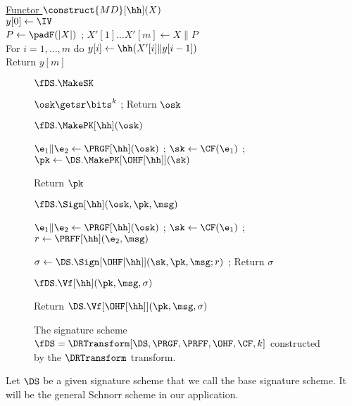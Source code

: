 \begin{tabbing}
\underline{Functor $\construct{MD}[\hh](X)$} \\[2pt]
$y[0] \gets \IV$ \\
$P\gets \padF(|X|)$ ; $X'[1]\ldots X'[m] \gets X\|P$  \\
For $i=1,\ldots,m$ do $y[i] \gets \hh(X'[i]\|y[i-1])$ \\
Return $y[m]$
\end{tabbing}



\begin{figure}[t]
{
  \begin{algorithm-initial}{$\fDS.\MakeSK$}
  \item $\osk\getsr\bits^k$ 
  ; Return $\osk$
  \end{algorithm-initial}

\begin{algorithm-subsequent}{$\fDS.\MakePK[\hh](\osk)$}
  \item $\e_1\|\e_2\gets\PRGF[\hh](\osk)$ 
  ; $\sk \gets \CF(\e_1)$ ; $\pk \gets \DS.\MakePK[\OHF[\hh]](\sk)$ 
  \item Return $\pk$
  \end{algorithm-subsequent}
  
  \begin{algorithm-subsequent}{$\fDS.\Sign[\hh](\osk, \pk, \msg)$}
\item $\e_1\|\e_2\gets\PRGF[\hh](\osk)$ 
  ; $\sk \gets \CF(\e_1)$ ; $r \gets \PRFF[\hh](\e_2,\msg)$  
\item $\sigma \gets \DS.\Sign[\OHF[\hh]](\sk,\pk,\msg;r)$ ; Return $\sigma$
  \end{algorithm-subsequent}

  \begin{algorithm-subsequent}{$\fDS.\Vf[\hh](\pk, \msg, \sigma)$}
    \item Return $\DS.\Vf[\OHF[\hh]](\pk,\msg,\sigma)$
  \end{algorithm-subsequent}  \vspace{2pt}
 }
\vspace{-8pt}
\caption{The signature scheme $\fDS = \DRTransform[\DS,\PRGF,\PRFF,\OHF,\CF,k]$ constructed by the $\DRTransform$ transform.}
\label{fig-dd}
\hrulefill
\vspace{-10pt}
\end{figure}




 Let $\DS$ be a given signature scheme that we call the base signature scheme. It will be the general Schnorr scheme in our application. 

